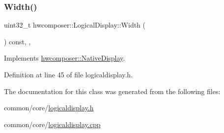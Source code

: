 \subsubsection{\texorpdfstring{Width()}{Width()}}
{\footnotesize\ttfamily uint32\+\_\+t hwcomposer\+::\+Logical\+Display\+::\+Width (\begin{DoxyParamCaption}{ }\end{DoxyParamCaption}) const\hspace{0.3cm}{\ttfamily [inline]}, {\ttfamily [override]}, {\ttfamily [virtual]}}



Implements \mbox{\hyperlink{classhwcomposer_1_1NativeDisplay_a9a18c3dfba567c86c088b06febda4019}{hwcomposer\+::\+Native\+Display}}.



Definition at line 45 of file logicaldisplay.\+h.


\begin{DoxyCode}{0}
\end{DoxyCode}


The documentation for this class was generated from the following files\+:\begin{DoxyCompactItemize}
\item 
common/core/\mbox{\hyperlink{logicaldisplay_8h}{logicaldisplay.\+h}}\item 
common/core/\mbox{\hyperlink{logicaldisplay_8cpp}{logicaldisplay.\+cpp}}\end{DoxyCompactItemize}
